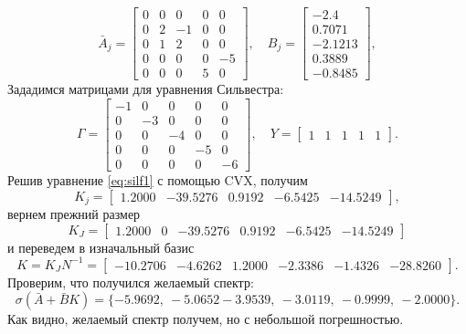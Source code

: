 \begin{equation*}
    \bar A_j=\begin{bmatrix}
       0 & 0 & 0 & 0 & 0 \\
       0  & 2 & -1 & 0 & 0 \\
       0  & 1 & 2 & 0 & 0 \\
       0  & 0 & 0 & 0 & -5 \\
       0 & 0 & 0 & 5 & 0
       \end{bmatrix},\quad
       B_j=\begin{bmatrix}
       -2.4 \\
       0.7071 \\
       -2.1213 \\
       0.3889 \\
       -0.8485
       \end{bmatrix},
\end{equation*}
Зададимся матрицами для уравнения Сильвестра:
\begin{equation*}
    \Gamma=\begin{bmatrix}
        -1 & 0 & 0 & 0 & 0 \\
         0 & -3 & 0 & 0 & 0 \\
         0 &  0 & -4 & 0 & 0 \\
         0 &  0 &  0 & -5 & 0 \\
         0 &  0 &  0 &  0 & -6
    \end{bmatrix},\quad
    Y=\begin{bmatrix}
        1 & 1 & 1 & 1 & 1
    \end{bmatrix}.
\end{equation*}
Решив уравнение \eqref{eq:silf1} с помощью CVX, получим
\begin{equation*}
    K_j=\begin{bmatrix}
        1.2000&	-39.5276&	0.9192	&-6.5425&	-14.5249
    \end{bmatrix},
\end{equation*}
вернем прежний размер
\begin{equation*}
    K_J=\begin{bmatrix}
        1.2000	&0 &-39.5276	&0.9192	&-6.5425	&-14.5249
    \end{bmatrix}
\end{equation*}
и переведем в изначальный базис
\begin{equation*}
    K=K_JN^{-1}=\begin{bmatrix}
        -10.2706	&-4.6262&	1.2000&	-2.3386&	-1.4326&	-28.8260
    \end{bmatrix}.
\end{equation*}
Проверим, что получился желаемый спектр:
\begin{equation*}
    \sigma(\bar A+\bar BK)=\{-5.9692,\ -5.0652
    -3.9539,\ 
    -3.0119,\ 
    -0.9999,\ 
    -2.0000\}.
\end{equation*}
Как видно, желаемый спектр получем, но с небольшой погрешностью.


